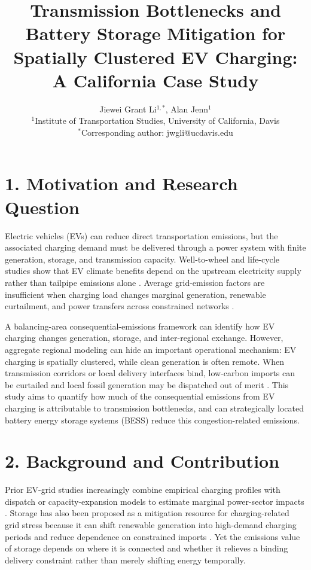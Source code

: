 \documentclass[11pt]{article}
\title{\vspace{-1.25em}Transmission Bottlenecks and Battery Storage Mitigation for Spatially Clustered EV Charging: A California Case Study}
\author{Jiewei Grant Li$^{1,*}$, Alan Jenn$^{1}$\\
\small $^1$Institute of Transportation Studies, University of California, Davis\\
\small $^*$Corresponding author: jwgli@ucdavis.edu}
\date{}
\begin{document}
\maketitle

\section*{1. Motivation and Research Question}

Electric vehicles (EVs) can reduce direct transportation emissions, but the associated charging demand must be delivered through a power system with finite generation, storage, and transmission capacity. Well-to-wheel and life-cycle studies show that EV climate benefits depend on the upstream electricity supply rather than tailpipe emissions alone \cite{hawkins_comparative_2013,tamayao_regional_2015,challa_well--wheel_2022}. Average grid-emission factors are insufficient when charging load changes marginal generation, renewable curtailment, and power transfers across constrained networks \cite{ambrose_trends_2020,burton_data-driven_2023}.

A balancing-area consequential-emissions framework can identify how EV charging changes generation, storage, and inter-regional exchange. However, aggregate regional modeling can hide an important operational mechanism: EV charging is spatially clustered, while clean generation is often remote. When transmission corridors or local delivery interfaces bind, low-carbon imports can be curtailed and local fossil generation may be dispatched out of merit \cite{bird_wind_2016,ahmed_grid_2020}. This study aims to quantify how much of the consequential emissions from EV charging is attributable to transmission bottlenecks, and can strategically located battery energy storage systems (BESS) reduce this congestion-related emissions.

\section*{2. Background and Contribution}

Prior EV-grid studies increasingly combine empirical charging profiles with dispatch or capacity-expansion models to estimate marginal power-sector impacts \cite{powell_scalable_2022,jenn_environmental_2020,jenn_emissions_2023,bruchon_cleaning_2024}. Storage has also been proposed as a mitigation resource for charging-related grid stress because it can shift renewable generation into high-demand charging periods and reduce dependence on constrained imports \cite{mowry_grid_2021,nagarajan_value_2018,ziegler_storage_2019,sihvonen_techno-socio-economic_2025}. Yet the emissions value of storage depends on where it is connected and whether it relieves a binding delivery constraint rather than merely shifting energy temporally.
\end{document}
